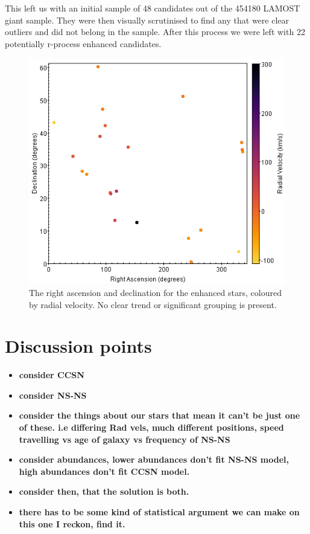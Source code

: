 \documentclass[a4paper,fleqn,usenatbib]{mnras}
\begin{document}
This left us with an initial sample of 48 candidates out of the 454180 LAMOST giant sample. They were then visually scrutinised to find any that were clear outliers and did not belong in the sample. After this process we were left with 22 potentially r-process enhanced candidates.

\begin{figure}
	\includegraphics[width=\columnwidth]{RA_v_dec_radial_velocity}
	\caption{The right ascension and declination for the enhanced stars, coloured by radial velocity. No clear trend or significant grouping is present.}
	\label{fig:radec_Eucands}
\end{figure}

\section{Discussion points}
\begin{itemize}
	\item \textbf{consider CCSN}
	\item \textbf{consider NS-NS}
	\item \textbf{consider the things about our stars that mean it can't be just one of these. i.e differing Rad vels, much different positions, speed travelling vs age of galaxy vs frequency of NS-NS} 
	\item \textbf{consider abundances, lower abundances don't fit NS-NS model, high abundances don't fit CCSN model.}
	\item \textbf{consider then, that the solution is both.}
	\item \textbf{there has to be some kind of statistical argument we can make on this one I reckon, find it.}
\end{itemize}
\end{document}
